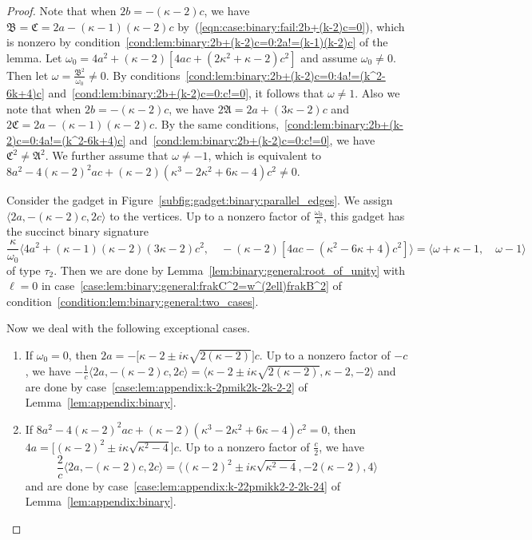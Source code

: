 \documentclass[11pt]{article}
\begin{document}
\begin{proof}
 Note that when $2 b  = - (\kappa - 2) c$,
 we have $\mathfrak{B} = \mathfrak{C} = 2 a - (\kappa - 1) (\kappa - 2) c$ by~(\ref{eqn:case:binary:fail:2b+(k-2)c=0}),
 which is nonzero by condition~\ref{cond:lem:binary:2b+(k-2)c=0:2a!=(k-1)(k-2)c} of the lemma.
 Let $\omega_0 = 4 a^2 + (\kappa - 2) [4 ac + (2 \kappa^2 + \kappa - 2) c^2]$
 and assume $\omega_0 \ne 0$.
 Then let $\omega = \frac{\mathfrak{B}^2}{\omega_0} \ne 0$.
 By conditions~\ref{cond:lem:binary:2b+(k-2)c=0:4a!=(k^2-6k+4)c} and~\ref{cond:lem:binary:2b+(k-2)c=0:c!=0},
 it follows that $\omega \ne 1$.
 Also we note that when $2 b  = - (\kappa - 2) c$,
 we have $2 \mathfrak{A} = 2 a + (3 \kappa - 2) c$ and $2 \mathfrak{C} = 2 a - (\kappa - 1) (\kappa - 2) c$.
 By the same conditions,~\ref{cond:lem:binary:2b+(k-2)c=0:4a!=(k^2-6k+4)c} and~\ref{cond:lem:binary:2b+(k-2)c=0:c!=0},
 we have $\mathfrak{C}^2 \ne \mathfrak{A}^2$.
 We further assume that $\omega \ne -1$,
 which is equivalent to $8 a^2 - 4 (\kappa - 2)^2 a c + (\kappa - 2) (\kappa^3 - 2 \kappa^2 + 6 \kappa - 4) c^2 \ne 0$.
 
 Consider the gadget in Figure~\ref{subfig:gadget:binary:parallel_edges}.
 We assign $\langle 2 a, -(\kappa - 2) c, 2 c \rangle$ to the vertices.
 Up to a nonzero factor of $\frac{\omega_0}{\kappa}$,
 this gadget has the succinct binary signature
 \[
  \frac{\kappa}{\omega_0}
  \langle
   4 a^2 + (\kappa - 1) (\kappa - 2) (3 \kappa - 2) c^2,
   \quad
   -(\kappa - 2) [4 ac - (\kappa^2 - 6 \kappa + 4) c^2] \rangle
  =
  \langle
   \omega + \kappa - 1,
   \quad
   \omega - 1
  \rangle
 \]
 of type $\tau_2$.
 Then we are done by Lemma~\ref{lem:binary:general:root_of_unity} with $\ell = 0$
 in case~\ref{case:lem:binary:general:frakC^2=w^(2ell)frakB^2} of condition~\ref{condition:lem:binary:general:two_cases}.
 
 Now we deal with the following exceptional cases.
 \begin{enumerate}
  \item If $\omega_0 = 0$,
  then $2 a = -\big[\kappa - 2 \pm i \kappa \sqrt{2 (\kappa - 2)}\big] c$.
  Up to a nonzero factor of $-c$,
  we have $-\frac{1}{c} \langle 2 a, -(\kappa - 2) c, 2 c \rangle = \langle \kappa - 2 \pm i \kappa \sqrt{2 (\kappa - 2)}, \kappa - 2, -2 \rangle$
  and are done by case~\ref{case:lem:appendix:k-2pmik2k-2k-2-2} of Lemma~\ref{lem:appendix:binary}.
  
  \item If $8 a^2 - 4 (\kappa - 2)^2 a c + (\kappa - 2) (\kappa^3 - 2 \kappa^2 + 6 \kappa - 4) c^2 = 0$,
  then $4 a = \big[(\kappa - 2)^2 \pm i \kappa \sqrt{\kappa^2 - 4}\big] c$.
  Up to a nonzero factor of $\frac{c}{2}$,
  we have
  \[
   \frac{2}{c} \langle 2 a, -(\kappa - 2) c, 2 c \rangle
   = \langle (\kappa - 2)^2 \pm i \kappa \sqrt{\kappa^2 - 4}, -2 (\kappa - 2), 4 \rangle
  \]
  and are done by case~\ref{case:lem:appendix:k-22pmikk2-2-2k-24} of Lemma~\ref{lem:appendix:binary}.
  \qedhere
 \end{enumerate}
\end{proof}
\end{document}

